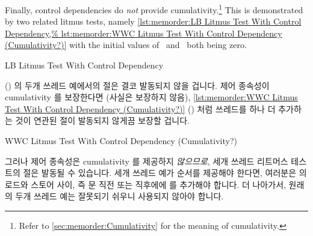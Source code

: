 Finally, control dependencies do \emph{not} provide cumulativity.\footnote{
	Refer to \cref{sec:memorder:Cumulativity} for
	the meaning of cumulativity.}
This is demonstrated by two related litmus tests, namely
\cref{lst:memorder:LB Litmus Test With Control Dependency,%
lst:memorder:WWC Litmus Test With Control Dependency (Cumulativity?)}
with the initial values
of~ and~ both being zero.

\fi

\begin{listing}[tbp]

\caption{LB Litmus Test With Control Dependency}
\label{lst:memorder:LB Litmus Test With Control Dependency}
\end{listing}

()
의 두개 쓰레드 예에서의  절은 결코 발동되지 않을 겁니다.
제어 종속성이 cumulativity 를 보장한다면 (사실은 보장하지 않음),
\cref{lst:memorder:WWC Litmus Test With Control Dependency (Cumulativity?)}
()
처럼 쓰레드를 하나 더 추가하는 것이 연관된  절이 발동되지 않게끔
보장할 겁니다.

\begin{listing}

\caption{WWC Litmus Test With Control Dependency (Cumulativity?)}
\label{lst:memorder:WWC Litmus Test With Control Dependency (Cumulativity?)}
\end{listing}

그러나 제어 종속성은 cumulativity 를 제공하지 \emph{않으므로}, 세개 쓰레드
리트머스 테스트의  절은 발동될 수 있습니다.
세개 쓰레드 예가 순서를 제공해야 한다면, 여러분은  의 로드와 스토어
사이, 즉  문 직전 또는 직후에에  를 추가해야 합니다.
더 나아가서, 원래의 두개 쓰레드 예는 잘못되기 쉬우니 사용되지 않아야 합니다.

